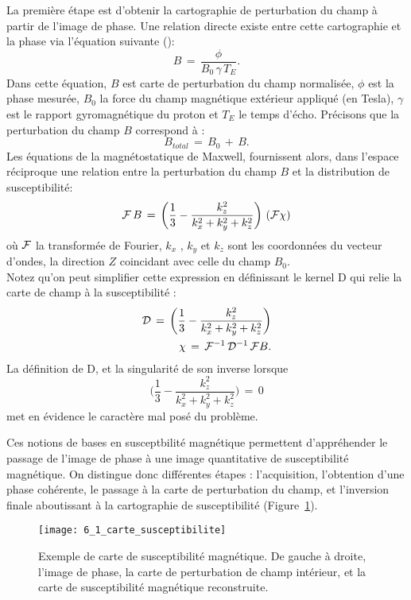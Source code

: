 La première étape est d’obtenir la cartographie de perturbation du champ à partir de l’image
de phase. Une relation directe existe entre cette cartographie et la phase via l’équation suivante (\cite{Bilgic2012}):
\begin{equation}
\label{eq:champ_phase}
B\,=\,\frac{\phi}{B_0\,\gamma\,T_E}.
\end{equation}
Dans cette équation, $B$ est carte de perturbation du champ normalisée, $\phi$ est la phase
mesurée, $B_0 $ la force du champ magnétique extérieur appliqué (en Tesla), $\gamma$ est le rapport
gyromagnétique du proton et $T_E$ le temps d’écho. Précisons que la perturbation du champ $B$
correspond à :
\begin{equation}
B_{total}\,=\,B_0\,+\,B.
\end{equation}
Les équations de la magnétostatique de Maxwell, fournissent alors, dans l’espace réciproque
une relation entre la perturbation du champ $B $ et la distribution de susceptibilité:
\begin{equation}
{\cal F}\,B\,=\,\biggl(\frac{1}{3}-\frac{k_z^2}{k_x^2+k_y^2+k_z^2}\biggr)\,\,({\cal F}\chi )
\end{equation}
où ${\cal F}$ la transformée de Fourier, $k_x$ , $k_y$ et $k_z$ sont les coordonnées du vecteur d’ondes, la direction $Z$
coincidant avec celle du champ $B_0$.\\
Notez qu’on peut simplifier cette expression en définissant le kernel D qui relie la carte de champ à la
susceptibilité :
\begin{eqnarray}
{\cal D}\,=\,\biggl(\frac{1}{3}-\frac{k_z^2}{k_x^2+k_y^2+k_z^2}\biggr)\\
\chi\,=\,{\cal F}^{-1}\,{\cal D}^{-1}\,{\cal F} B.
\end{eqnarray}
La définition de D, et la singularité de son inverse lorsque
\begin{equation}
\biggl(\frac{1}{3}-\frac{k_z^2}{k_x^2+k_y^2+k_z^2}\biggr)\,=\,0
\end{equation}
met en évidence le caractère mal posé du problème.

Ces notions de bases en susceptbilité magnétique permettent d’appréhender le passage de
l’image de phase à une image quantitative de susceptibilité magnétique. On distingue donc différentes
étapes : l’acquisition, l’obtention d’une phase cohérente, le passage à la carte de perturbation du
champ, et l’inversion finale aboutissant à la cartographie de susceptibilité (Figure~\ref{fig:6_1_carte_susceptibilite}).
\begin{figure}[!t]
\centering
\texttt{[image: 6\_1\_carte\_susceptibilite]}
\caption{Exemple de carte de susceptibilité magnétique. De gauche à droite, l'image de phase, la carte de perturbation
de champ intérieur, et la carte de susceptibilité magnétique reconstruite.}
\label{fig:6_1_carte_susceptibilite}	
\end{figure}
